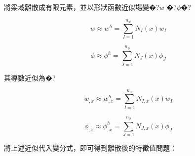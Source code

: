 \documentclass[UTF8, a4paper, 12pt]{ctexart}
\begin{document}



將梁域離散成有限元素，並以形狀函數近似場變�?$w$ �?$\phi$�?

\begin{equation}

    w \approx w^{h} = \sum_{I=1}^{n_{w}}N_{I}(x)w_{I}

\end{equation}

\begin{equation}

    \phi \approx \phi^{h} = \sum_{J=1}^{n_{\phi}}N_{J}(x)\phi_{J}

\end{equation}



其導數近似為�?

\begin{equation}

    w_{,x} \approx w_{,x}^{h} = \sum_{I=1}^{n_{w}}N_{I,x}(x)w_{I}

\end{equation}

\begin{equation}

    \phi_{,x} \approx \phi_{,x}^{h} = \sum_{J=1}^{n_{\phi}}N_{J,x}(x)\phi_{J}

\end{equation}






將上述近似代入變分式，即可得到離散後的特徵值問題：
\end{document}

